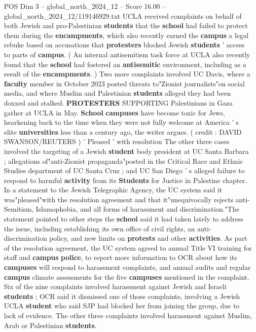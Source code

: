 \begin{textsample}{POS Dim 3 – global\_north\_2024\_12 – Score 16.00 – global\_north\_2024\_12/119146929.txt}
UCLA received complaints on behalf of both Jewish and pro-Palestinian \textbf{students} that the \textbf{school} had failed to protect them during the \textbf{encampments}, which also recently earned the \textbf{campus} a legal rebuke based on accusations that \textbf{protesters} blocked Jewish \textbf{students} ' access to parts of \textbf{campus}. ( An internal antisemitism task force at UCLA also recently found that the \textbf{school} had fostered an \textbf{antisemitic} environment, including as a result of the \textbf{encampments}. ) Two more complaints involved UC Davis, where a \textbf{faculty} member in October 2023 posted threats to"Zionist journalists"on social media, and where Muslim and Palestinian \textbf{students} alleged they had been doxxed and stalked. \textbf{PROTESTERS} SUPPORTING Palestinians in Gaza gather at UCLA in May. \textbf{School} \textbf{campuses} have become toxic for Jews, hearkening back to the time when they were not fully welcome at America ' s elite \textbf{universities} less than a century ago, the writer argues. ( credit : DAVID SWANSON/REUTERS ) ' Pleased ' with resolution The other three cases involved the targeting of a Jewish \textbf{student} body president at UC Santa Barbara ; allegations of"anti-Zionist propaganda"posted in the Critical Race and Ethnic Studies department of UC Santa Cruz ; and UC San Diego ' s alleged failure to respond to harmful \textbf{activity} from its \textbf{Students} for Justice in Palestine chapter.
In a statement to the Jewish Telegraphic Agency, the UC system said it was"pleased"with the resolution agreement and that it"unequivocally rejects anti-Semitism, Islamophobia, and all forms of harassment and discrimination."The statement pointed to other steps the \textbf{school} said it had taken lately to address the issue, including establishing its own office of civil rights, an anti-discrimination policy, and new limits on \textbf{protests} and other \textbf{activities}.
As part of the resolution agreement, the UC system agreed to annual Title VI training for staff and \textbf{campus} \textbf{police}, to report more information to OCR about how its \textbf{campuses} will respond to harassment complaints, and annual audits and regular \textbf{campus} climate assessments for the five \textbf{campuses} mentioned in the complaint.
Six of the nine complaints involved harassment against Jewish and Israeli \textbf{students} ; OCR said it dismissed one of those complaints, involving a Jewish UCLA \textbf{student} who said SJP had blocked her from joining the group, due to lack of evidence.
The other three complaints involved harassment against Muslim, Arab or Palestinian \textbf{students}.

\end{textsample}
